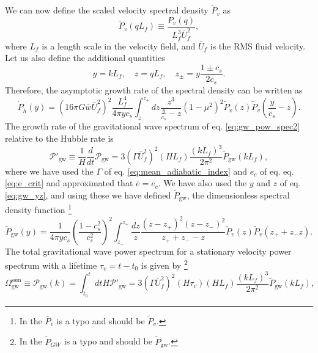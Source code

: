 We can now define the scaled velocity spectral density $\tilde{P}_v$ as
\begin{equation}
\tilde{P}_v (qL_f) \equiv \frac{P_v(q)}{L_f^3 \bar{U}_f^2},
\label{eq:tilde_p_v}
\end{equation}
where $L_f$ is a length scale in the velocity field, and $\bar{U}_f$ is the RMS fluid velocity.
Let us also define the additional quantities
\begin{equation}
y = kL_f, \quad z = qL_f, \quad z_\pm = y \frac{1 \pm c_s}{2 c_s}.
\label{eq:gw_yz}
\end{equation}
Therefore, the asymptotic growth rate of the spectral density can be written as
\begin{equation}
\dot{P}_{\dot{h}}(y) =
\left( 16 \pi G \bar{w} \bar{U}_f^2 \right)^2
\frac{L_f^4}{4 \pi y c_s}
\int_{z_-}^{z_+} dz
\frac{z^3}{\frac{y}{c_s} - z}
(1 - \mu^2)^2
\tilde{P}_v (z) \tilde{P}_v \left( \frac{y}{c_s} - z \right).
\end{equation}
The growth rate of the gravitational wave spectrum of eq. \eqref{eq:gw_pow_spec2} relative to the Hubble rate is
\cite[eq. 3.46]{hindmarsh_gw_pt_2019}
\begin{equation}
\mathcal{P}'_{\text{gw}} \equiv \frac{1}{H} \frac{d}{dt} \mathcal{P}_{\text{gw}}
= 3 \left( \Gamma \bar{U}_f^2 \right)^2 (HL_f) \frac{(kL_f)^3}{2 \pi^2} \tilde{P}_{\text{gw}} (kL_f),
\label{eq:pow_gw_prime}
\end{equation}
where we have used the $\Gamma$ of eq. \eqref{eq:mean_adiabatic_index} and $e_c$ of eq. eq. \eqref{eq:e_crit} and approximated that $\bar{e} = e_c$.
We have also used the $y$ and $z$ of eq. \eqref{eq:gw_yz}, and using these we have defined $\tilde{P}_{\text{gw}}$,
the dimensionless spectral density function
\cite[eq. 3.47]{hindmarsh_gw_pt_2019}%
\footnote{In \cite{hindmarsh_gw_pt_2019} the $\bar{P}_v$ is a typo and should be $\tilde{P}_v$.}
\begin{equation}
\tilde{P}_\text{gw} (y) = \frac{1}{4\pi yc_s} \left(\frac{1-c_s^2}{c_s^2}\right)^2
\int_{z_-}^{z_+} \frac{dz}{z}
\frac{(z-z_+)^2(z-z_-)^2}{z_+ + z_- - z}
\tilde{P}_v (z) \tilde{P}_v (z_+ + z_- z).
\label{eq:spectral_density}
\end{equation}
The total gravitational wave power spectrum for a stationary velocity power spectrum with a lifetime $\tau_v = t - t_0$ is given by
\cite[eq. 3.48]{hindmarsh_gw_pt_2019}%
\footnote{In \cite{hindmarsh_gw_pt_2019} the $\tilde{P}_{GW}$ is a typo and should be $\tilde{P}_\text{gw}$.}
\begin{equation}
\Omega_\text{gw}^\text{ssm}
\equiv \mathcal{P}_\text{gw}(k)
= \int_{t_0}^{t} dt H \mathcal{P}'_\text{gw}
= 3 \left( \Gamma \bar{U}_f^2 \right)^2 (H \tau_v)(H L_f) \frac{(kL_f)^3}{2\pi^2} \tilde{P}_\text{gw} (kL_f),
\label{eq:gw_pow_spec3}
\end{equation}
